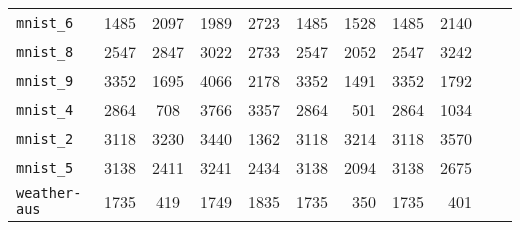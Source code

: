 \begin{tabular}{lccrrrrrrrr}
\texttt{mnist\_6} & 1485 & 2097 & 1989 & 2723 & 1485 & 1528 & 1485 & 2140\\
\texttt{mnist\_8} & 2547 & 2847 & 3022 & 2733 & 2547 & 2052 & 2547 & 3242\\
\texttt{mnist\_9} & 3352 & 1695 & 4066 & 2178 & 3352 & 1491 & 3352 & 1792\\
\texttt{mnist\_4} & 2864 & 708 & 3766 & 3357 & 2864 & 501 & 2864 & 1034\\
\texttt{mnist\_2} & 3118 & 3230 & 3440 & 1362 & 3118 & 3214 & 3118 & 3570\\
\texttt{mnist\_5} & 3138 & 2411 & 3241 & 2434 & 3138 & 2094 & 3138 & 2675\\
\texttt{weather-aus} & 1735 & 419 & 1749 & 1835 & 1735 & 350 & 1735 & 401\\
\bottomrule
\end{tabular}
